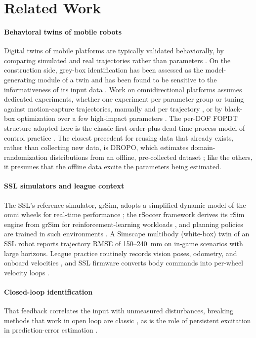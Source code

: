 \section{Related Work}
\label{sec:related}

\paragraph{Behavioral twins of mobile robots}


Digital twins of mobile platforms are typically validated behaviorally, by comparing simulated and real trajectories rather than parameters \cite{barioni2024development,yang2025digital}. On the construction side, grey-box identification has been assessed as the model-generating module of a twin and has been found to be sensitive to the informativeness of its input data \cite{brennan2025greybox}. Work on omnidirectional platforms assumes dedicated experiments, whether one experiment per parameter group \cite{giro2023otbot} or tuning against motion-capture trajectories, manually and per trajectory
\cite{wiedemann2024simulation}, or by black-box optimization over a few high-impact parameters \cite{wiedemann2025automated}. The per-DOF FOPDT structure adopted here is the classic first-order-plus-dead-time process model of control practice \cite{astrom1995pid}. The closest precedent for reusing
data that already exists, rather than collecting new data, is DROPO, which estimates domain-randomization distributions from an offline, pre-collected dataset \cite{tiboni2023dropo}; like the others, it presumes that the offline data excite the parameters being estimated.

\paragraph{SSL simulators and league context}
The SSL's reference simulator, grSim, adopts a simplified dynamic model of the omni wheels for real-time performance \cite{monajjemi2012grsim}; the rSoccer framework derives its rSim engine from grSim for reinforcement-learning workloads \cite{martins2021rsoccer}, and planning policies are trained in such environments \cite{machado2025planning}. A Simscape multibody (white-box) twin of an SSL robot reports trajectory RMSE of 150--240~mm on in-game scenarios with large horizons\cite{araujo2025digital}. League practice routinely records vision poses, odometry, and onboard velocities \cite{melo2023dataset}, and SSL firmware
converts body commands into per-wheel velocity loops \cite{freiberger2024implementation}.

\paragraph{Closed-loop identification}
That feedback correlates the input with unmeasured disturbances, breaking methods that work in open loop are classic \cite{gustavsson1977identification,vandenhof1998closedloop,forssell1999closedloop}, as is the role of persistent excitation in prediction-error estimation \cite{ljung1999system}.